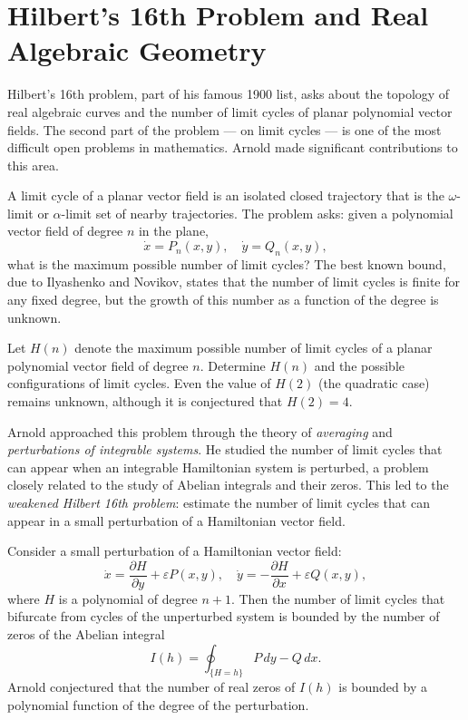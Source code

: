 \section{Hilbert's 16th Problem and Real Algebraic Geometry}

Hilbert's 16th problem, part of his famous 1900 list, asks about the topology of real algebraic curves and the number of limit cycles of planar polynomial vector fields. The second part of the problem --- on limit cycles --- is one of the most difficult open problems in mathematics. Arnold made significant contributions to this area.

A limit cycle of a planar vector field is an isolated closed trajectory that is the \(\omega\)-limit or \(\alpha\)-limit set of nearby trajectories. The problem asks: given a polynomial vector field of degree \(n\) in the plane,
\[
\dot{x} = P_n(x,y), \quad \dot{y} = Q_n(x,y),
\]
what is the maximum possible number of limit cycles? The best known bound, due to Ilyashenko and Novikov, states that the number of limit cycles is finite for any fixed degree, but the growth of this number as a function of the degree is unknown.

\begin{condition}
Let \(H(n)\) denote the maximum possible number of limit cycles of a planar polynomial vector field of degree \(n\). Determine \(H(n)\) and the possible configurations of limit cycles. Even the value of \(H(2)\) (the quadratic case) remains unknown, although it is conjectured that \(H(2) = 4\).
\end{condition}

Arnold approached this problem through the theory of \emph{averaging} and \emph{perturbations of integrable systems}. He studied the number of limit cycles that can appear when an integrable Hamiltonian system is perturbed, a problem closely related to the study of Abelian integrals and their zeros. This led to the \emph{weakened Hilbert 16th problem}: estimate the number of limit cycles that can appear in a small perturbation of a Hamiltonian vector field.

\begin{theorem}
Consider a small perturbation of a Hamiltonian vector field:
\[
\dot{x} = \frac{\partial H}{\partial y} + \varepsilon P(x,y), \quad
\dot{y} = -\frac{\partial H}{\partial x} + \varepsilon Q(x,y),
\]
where \(H\) is a polynomial of degree \(n+1\). Then the number of limit cycles that bifurcate from cycles of the unperturbed system is bounded by the number of zeros of the Abelian integral
\[
I(h) = \oint_{\{H = h\}} P\,dy - Q\,dx.
\]
Arnold conjectured that the number of real zeros of \(I(h)\) is bounded by a polynomial function of the degree of the perturbation.
\end{theorem}

